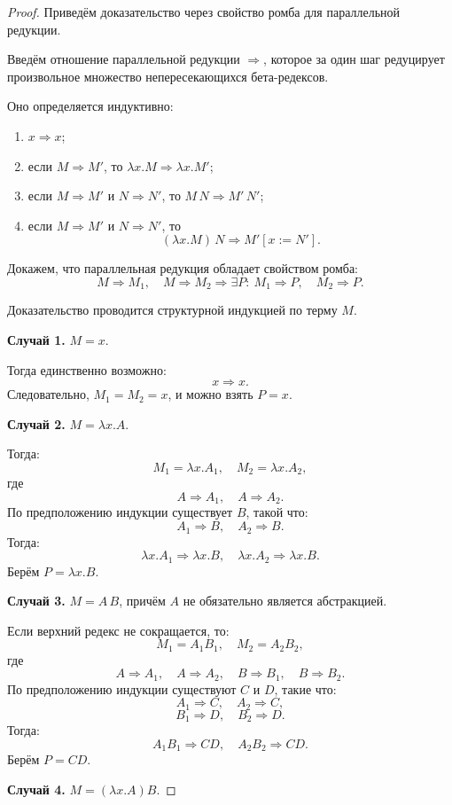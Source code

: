 \documentclass[12pt,a4paper]{article}
\begin{document}
\begin{proof}
Приведём доказательство через свойство ромба для параллельной редукции.

Введём отношение параллельной редукции $\Rightarrow$, которое за один шаг редуцирует произвольное множество непересекающихся бета-редексов.

Оно определяется индуктивно:
\begin{enumerate}
  \item $x \Rightarrow x$;
  \item если $M \Rightarrow M'$, то $\lambda x.M \Rightarrow \lambda x.M'$;
  \item если $M \Rightarrow M'$ и $N \Rightarrow N'$, то $M\,N \Rightarrow M'\,N'$;
  \item если $M \Rightarrow M'$ и $N \Rightarrow N'$, то
  \[
  (\lambda x.M)\,N \Rightarrow M'[x := N'].
  \]
\end{enumerate}

Докажем, что параллельная редукция обладает свойством ромба:
\[
M \Rightarrow M_1,\quad M \Rightarrow M_2
\Rightarrow
\exists P:\ M_1 \Rightarrow P,\quad M_2 \Rightarrow P.
\]

Доказательство проводится структурной индукцией по терму $M$.

\textbf{Случай 1.} $M = x$.

Тогда единственно возможно:
\[
x \Rightarrow x.
\]
Следовательно, $M_1 = M_2 = x$, и можно взять $P = x$.

\textbf{Случай 2.} $M = \lambda x.A$.

Тогда:
\[
M_1 = \lambda x.A_1,\quad M_2 = \lambda x.A_2,
\]
где
\[
A \Rightarrow A_1,\quad A \Rightarrow A_2.
\]
По предположению индукции существует $B$, такой что:
\[
A_1 \Rightarrow B,\quad A_2 \Rightarrow B.
\]
Тогда:
\[
\lambda x.A_1 \Rightarrow \lambda x.B,\quad
\lambda x.A_2 \Rightarrow \lambda x.B.
\]
Берём $P = \lambda x.B$.

\textbf{Случай 3.} $M = A\,B$, причём $A$ не обязательно является абстракцией.

Если верхний редекс не сокращается, то:
\[
M_1 = A_1 B_1,\quad M_2 = A_2 B_2,
\]
где
\[
A \Rightarrow A_1,\quad A \Rightarrow A_2,\quad
B \Rightarrow B_1,\quad B \Rightarrow B_2.
\]
По предположению индукции существуют $C$ и $D$, такие что:
\[
A_1 \Rightarrow C,\quad A_2 \Rightarrow C,
\]
\[
B_1 \Rightarrow D,\quad B_2 \Rightarrow D.
\]
Тогда:
\[
A_1B_1 \Rightarrow CD,\quad A_2B_2 \Rightarrow CD.
\]
Берём $P = CD$.

\textbf{Случай 4.} $M = (\lambda x.A)B$.


\end{proof}
\end{document}
